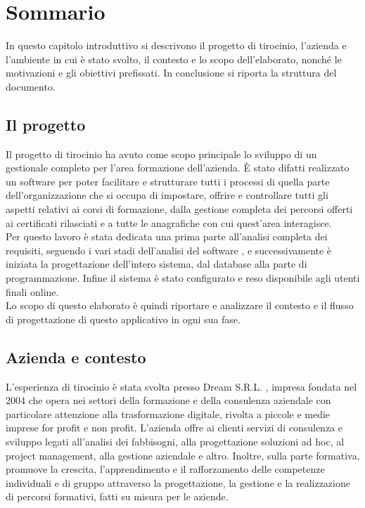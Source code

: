 \chapter*{Sommario} %
\label{sommario}

In questo capitolo introduttivo si descrivono il progetto di tirocinio, l'azienda e l'ambiente in cui è stato svolto, il contesto e lo scopo dell'elaborato, nonché le motivazioni e gli obiettivi prefissati. In conclusione si riporta la struttura del documento.

\section*{Il progetto}
\label{sec:progetto}
Il progetto di tirocinio ha avuto come scopo principale lo sviluppo di un gestionale completo per l'area formazione dell'azienda. È stato difatti realizzato un software per poter facilitare e strutturare tutti i processi di quella parte dell'organizzazione che si occupa di impostare, offrire e controllare tutti gli aspetti relativi ai corsi di formazione, dalla gestione completa dei percorsi offerti ai certificati rilasciati e a tutte le anagrafiche con cui quest’area interagisce.\\
\newline
Per questo lavoro è stata dedicata una prima parte all’analisi completa dei requisiti, seguendo i vari stadi dell'analisi del software \cite{analisis}, e successivamente è iniziata la progettazione dell’intero sistema, dal database alla parte di programmazione. Infine il sistema è stato configurato e reso disponibile agli utenti finali online.\\
\newline
Lo scopo di questo elaborato è quindi riportare e analizzare il contesto e il flusso di progettazione di questo applicativo in ogni sua fase.


\section*{Azienda e contesto}
\label{sec:contensto}
L'esperienza di tirocinio è stata svolta presso Dream S.R.L. \cite{dream}, impresa fondata nel 2004 che opera nei settori della formazione e della consulenza aziendale con particolare attenzione alla trasformazione digitale, rivolta a piccole e medie imprese for profit e non profit. L'azienda offre ai clienti servizi di consulenza e sviluppo legati all’analisi dei fabbisogni, alla progettazione soluzioni ad hoc, al project management, alla gestione aziendale e altro. Inoltre, sulla parte formativa, promuove la crescita, l’apprendimento e il rafforzamento delle competenze individuali e di gruppo attraverso la progettazione, la gestione e la realizzazione di percorsi formativi, fatti su misura per le aziende.

